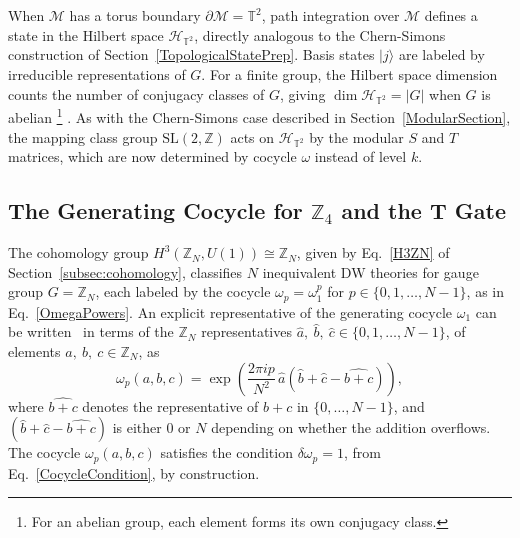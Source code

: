 \documentclass[12pt,a4paper]{article}
\def\ket#1{{|{#1}\rangle}}
\begin{document}
When $\mathcal{M}$ has a torus boundary $\partial\mathcal{M} = \mathbb{T}^2$, path integration over $\mathcal{M}$ defines a state in the Hilbert space $\mathcal{H}_{\mathbb{T}^2}$, directly analogous to the Chern-Simons construction of Section~\ref{TopologicalStatePrep}. Basis states $\ket{j}$ are labeled by irreducible representations of $G$. For a finite group, the Hilbert space dimension counts the number of conjugacy classes of $G$, giving $\dim\mathcal{H}_{\mathbb{T}^2} = |G|$ when $G$ is abelian%
%
\footnote{For an abelian group, each element forms its own conjugacy class.}%
%
. As with the Chern-Simons case described in Section~\ref{ModularSection}, the mapping class group $\mathrm{SL}(2,\mathbb{Z})$ acts on $\mathcal{H}_{\mathbb{T}^2}$ by the modular $S$ and $T$ matrices, which are now determined by cocycle $\omega$ instead of level $k$.

\subsection{The Generating Cocycle for $\mathbb{Z}_4$ and the T Gate}\label{subsec:cocycle}

The cohomology group $H^3(\mathbb{Z}_N, U(1)) \cong \mathbb{Z}_N$, given by Eq.\ \eqref{H3ZN} of Section~\ref{subsec:cohomology}, classifies $N$ inequivalent DW theories for gauge group $G = \mathbb{Z}_N$, each labeled by the cocycle $\omega_p = \omega_1^p$ for $p \in \{0, 1, \ldots, N-1\}$, as in Eq.\ \eqref{OmegaPowers}. An explicit representative of the generating cocycle $\omega_1$ can be written~\cite{Dijkgraaf:1990} in terms of the $\mathbb{Z}_N$ representatives $\hat{a},\ \hat{b},\ \hat{c} \in \{0, 1, \ldots, N-1\}$, of elements $a,\ b,\ c \in \mathbb{Z}_N$, as
%
\begin{equation}\label{GeneratingCocycle}
\omega_p(a, b, c) = \exp\left(\frac{2\pi i p}{N^2}\,\hat{a}\left(\hat{b} + \hat{c} - \widehat{b+c}\right)\right),
\end{equation}
%
where $\widehat{b+c}$ denotes the representative of $b + c$ in $\{0, \ldots, N-1\}$, and $(\hat{b} + \hat{c} - \widehat{b+c})$ is either $0$ or $N$ depending on whether the addition overflows. The cocycle $\omega_p(a, b, c)$ satisfies the condition $\delta\omega_p = 1$, from Eq.\ \eqref{CocycleCondition}, by construction.
\end{document}
